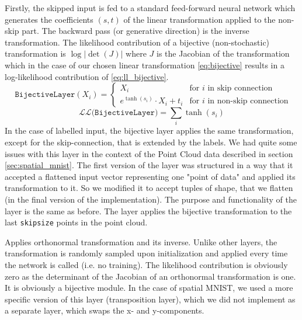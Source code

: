 Firstly, the skipped input is fed to a standard feed-forward neural network which generates the coefficients $(s,t)$ of the linear transformation applied to the non-skip part. The backward pass (or generative direction) is the inverse transformation. The likelihood contribution of a bijective (non-stochastic) transformation is $ \log | \det (J)|$ where $J$ is the Jacobian of the transformation which in the case of our chosen linear transformation \eqref{eq:bijective} results in a log-likelihood contribution of \eqref{eq:ll_bijective}. 
\begin{equation}
\texttt{ BijectiveLayer} (X_i) = \left\{ \begin{array}{rl}X_i & \text{for $i$ in skip connection} \\ e^{\tanh(s_i)} \cdot X_i + t_i & \text{for $i$ in non-skip connection} \end{array} \right.
\label{eq:bijective}
\end{equation}
\begin{equation}
    \mathcal{LL}\texttt{(BijectiveLayer)}= \sum_{i} \tanh(s_i)
    \label{eq:ll_bijective}
\end{equation}
In the case of labelled input, the bijective layer applies the same transformation, except for the skip-connection, that is extended by the labels. We had quite some issues with this layer in the context of the Point Cloud data described in section \ref{sec:spatial_mnist}. The first version of the layer was structured in a way that it accepted a flattened input vector representing one "point of data" and applied its transformation to it. So we modified it to accept tuples of shape, that we flatten (in the final version of the implementation). The purpose and functionality of the layer is the same as before. The layer applies the bijective transformation to the last \texttt{skip\textunderscore size} points in the point cloud.

\label{sec:orthonormal}
Applies orthonormal transformation and its inverse. Unlike other layers, the transformation is randomly sampled upon initialization and applied every time the network is called (i.e. no training). The likelihood contribution is obviously zero as the determinant of the Jacobian of an orthonormal transformation is one. It is obviously a bijective module. In the case of spatial MNIST, we used a more specific version of this layer (transposition layer), which we did not implement as a separate layer, which swaps the x- and y-components.


